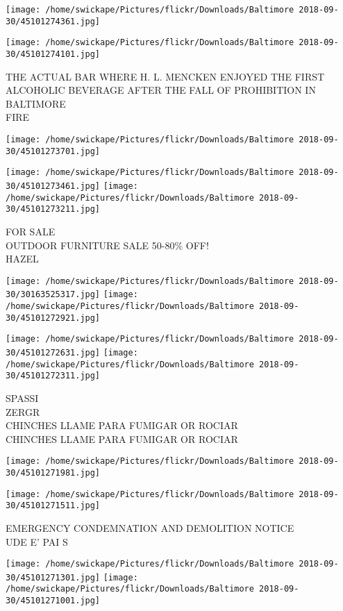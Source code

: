 \documentclass[10pt,letterpaper]{article}
\begin{document}
\texttt{[image: /home/swickape/Pictures/flickr/Downloads/Baltimore 2018-09-30/45101274361.jpg]}

\vspace{0.25in}
\texttt{[image: /home/swickape/Pictures/flickr/Downloads/Baltimore 2018-09-30/45101274101.jpg]}

THE ACTUAL BAR WHERE H. L. MENCKEN ENJOYED THE FIRST ALCOHOLIC BEVERAGE AFTER THE FALL OF PROHIBITION IN BALTIMORE\\
FIRE
\pagebreak

\texttt{[image: /home/swickape/Pictures/flickr/Downloads/Baltimore 2018-09-30/45101273701.jpg]}

\vspace{0.25in}
\texttt{[image: /home/swickape/Pictures/flickr/Downloads/Baltimore 2018-09-30/45101273461.jpg]}
\texttt{[image: /home/swickape/Pictures/flickr/Downloads/Baltimore 2018-09-30/45101273211.jpg]}

FOR SALE\\
OUTDOOR FURNITURE SALE 50{-}80\% OFF!\\
HAZEL
\pagebreak

\texttt{[image: /home/swickape/Pictures/flickr/Downloads/Baltimore 2018-09-30/30163525317.jpg]}
\texttt{[image: /home/swickape/Pictures/flickr/Downloads/Baltimore 2018-09-30/45101272921.jpg]}

\texttt{[image: /home/swickape/Pictures/flickr/Downloads/Baltimore 2018-09-30/45101272631.jpg]}
\texttt{[image: /home/swickape/Pictures/flickr/Downloads/Baltimore 2018-09-30/45101272311.jpg]}

SPASSI\\
ZERGR\\
CHINCHES LLAME PARA FUMIGAR OR ROCIAR\\
CHINCHES LLAME PARA FUMIGAR OR ROCIAR
\pagebreak

\texttt{[image: /home/swickape/Pictures/flickr/Downloads/Baltimore 2018-09-30/45101271981.jpg]}

\vspace{0.25in}
\texttt{[image: /home/swickape/Pictures/flickr/Downloads/Baltimore 2018-09-30/45101271511.jpg]}

EMERGENCY CONDEMNATION AND DEMOLITION NOTICE\\
UDE E' PAI S
\pagebreak

\texttt{[image: /home/swickape/Pictures/flickr/Downloads/Baltimore 2018-09-30/45101271301.jpg]}
\texttt{[image: /home/swickape/Pictures/flickr/Downloads/Baltimore 2018-09-30/45101271001.jpg]}
\end{document}
